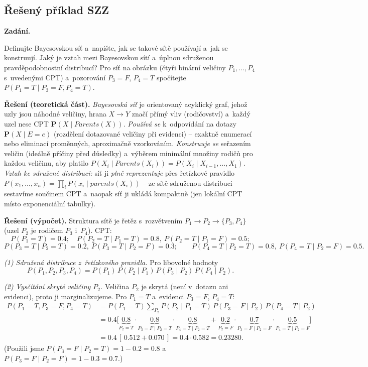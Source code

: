 \subsection{Řešený příklad SZZ}

\begin{priklad}
\par
\textbf{Zadání.}\par
Definujte Bayesovskou síť a~napište, jak se takové sítě používají a~jak se konstruují. Jaký je vztah mezi Bayesovskou sítí a~úplnou sdruženou pravděpodobnostní distribucí? Pro síť na obrázku (čtyři binární veličiny $P_1,\dots,P_4$ s~uvedenými CPT) a~pozorování $P_3{=}F$, $P_4{=}T$ spočítejte $P(P_1{=}T\mid P_3{=}F,P_4{=}T)$.

\medskip
\textbf{Řešení (teoretická část).}
\emph{Bayesovská síť} je orientovaný acyklický graf, jehož uzly jsou náhodné veličiny, hrana $X\to Y$ značí přímý vliv (rodičovství) a~každý uzel nese CPT $\mathbf{P}(X\mid \mathit{Parents}(X))$. \emph{Používá se} k~odpovídání na dotazy $\mathbf{P}(X\mid E{=}e)$ (rozdělení dotazované veličiny při evidenci) -- exaktně enumerací nebo eliminací proměnných, aproximačně vzorkováním. \emph{Konstruuje se} seřazením veličin (ideálně příčiny před důsledky) a~výběrem minimální množiny rodičů pro každou veličinu, aby platilo $P(X_i\mid \mathit{Parents}(X_i))=P(X_i\mid X_{i-1},\dots,X_1)$. \emph{Vztah ke sdružené distribuci:} síť ji \emph{plně reprezentuje} přes řetízkové pravidlo $P(x_1,\dots,x_n)=\prod_i P(x_i\mid \mathit{parents}(X_i))$ -- ze sítě sdruženou distribuci sestavíme součinem CPT a~naopak síť ji ukládá kompaktně (jen lokální CPT místo exponenciální tabulky).

\medskip
\textbf{Řešení (výpočet).} Struktura sítě je řetěz s~rozvětvením $P_1\to P_2\to\{P_3,P_4\}$ (uzel $P_2$ je rodičem $P_3$ i~$P_4$). CPT:
\[ P(P_1{=}T)=0.4;\quad P(P_2{=}T\mid P_1{=}T)=0.8,\ P(P_2{=}T\mid P_1{=}F)=0.5; \]
\[ P(P_3{=}T\mid P_2{=}T)=0.2,\ P(P_3{=}T\mid P_2{=}F)=0.3;\qquad P(P_4{=}T\mid P_2{=}T)=0.8,\ P(P_4{=}T\mid P_2{=}F)=0.5. \]

\emph{(1) Sdružená distribuce z~řetízkového pravidla.} Pro libovolné hodnoty
\[ P(P_1,P_2,P_3,P_4)=P(P_1)\,P(P_2\mid P_1)\,P(P_3\mid P_2)\,P(P_4\mid P_2). \]

\emph{(2) Vysčítání skryté veličiny $P_2$.} Veličina $P_2$ je skrytá (není v~dotazu ani evidenci), proto ji marginalizujeme. Pro $P_1{=}T$ a~evidenci $P_3{=}F$, $P_4{=}T$:
\begin{align*}
P(P_1{=}T,P_3{=}F,P_4{=}T)
&=P(P_1{=}T)\sum_{P_2}P(P_2\mid P_1{=}T)\,P(P_3{=}F\mid P_2)\,P(P_4{=}T\mid P_2)\\
&=0.4\Big[\underbrace{0.8}_{P_2{=}T}\cdot\underbrace{0.8}_{P_3{=}F\mid P_2{=}T}\cdot\underbrace{0.8}_{P_4{=}T\mid P_2{=}T}
+\underbrace{0.2}_{P_2{=}F}\cdot\underbrace{0.7}_{P_3{=}F\mid P_2{=}F}\cdot\underbrace{0.5}_{P_4{=}T\mid P_2{=}F}\Big]\\
&=0.4\,[\,0.512+0.070\,]=0.4\cdot0.582=0.23280.
\end{align*}
(Použili jsme $P(P_3{=}F\mid P_2{=}T)=1-0.2=0.8$ a~$P(P_3{=}F\mid P_2{=}F)=1-0.3=0.7$.)


\end{priklad}
